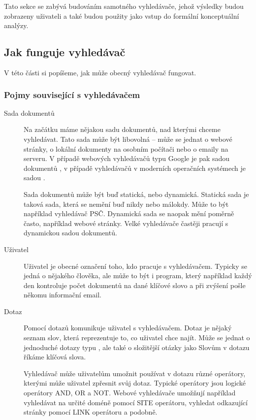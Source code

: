 \documentclass[12pt]{article}
\begin{document}
Tato sekce se zabývá budováním samotného vyhledávače, jehož výsledky budou zobrazeny uživateli a také budou použity jako vstup do formální konceptuální analýzy. 

\subsection{Jak funguje vyhledávač}
V této části si popíšeme, jak může obecný vyhledávač fungovat. 

\subsubsection{Pojmy související s vyhledávačem}
\begin{description}
\item[Sada dokumentů] Na začátku máme nějakou sadu dokumentů, nad kterými chceme vyhledávat. Tato sada může být libovolná -- může se jednat o webové stránky, o lokální dokumenty na osobním počítači nebo o emaily na serveru. V případě webových vyhledávačů typu Google je pak sadou dokumentů , v případě vyhledávačů v moderních operačních systémech je sadou . 

Sada dokumentů může být buď statická, nebo dynamická. Statická sada je taková sada, která se nemění buď nikdy nebo málokdy. Může to být například vyhledávač PSČ. Dynamická sada se naopak mění poměrně často, například webové stránky. Velké vyhledávače častěji pracují s dynamickou sadou dokumentů. 

\item[Uživatel] Uživatel je obecné označení toho, kdo pracuje s vyhledávačem. Typicky se jedná o nějakého člověka, ale může to být i program, který například každý den kontroluje počet dokumentů na dané klíčové slovo a při zvýšení pošle někomu informační email. 

\item[Dotaz] Pomocí dotazů komunikuje uživatel s vyhledávačem. Dotaz je nějaký seznam slov, která reprezentuje to, co uživatel chce najít. Může se jednat o jednoduché dotazy typu , ale také o složitější otázky jako  Slovům v dotazu říkáme klíčová slova. 

Vyhledávač může uživatelům umožnit používat v dotazu různé operátory, kterými může uživatel zpřesnit svůj dotaz. Typické operátory jsou logické operátory AND, OR a NOT. Webové vyhledávače umožňují například vyhledávat na určité doméně pomocí SITE operátoru, vyhledat odkazující stránky pomocí LINK operátoru a podobně. 


\end{description}
\end{document}

